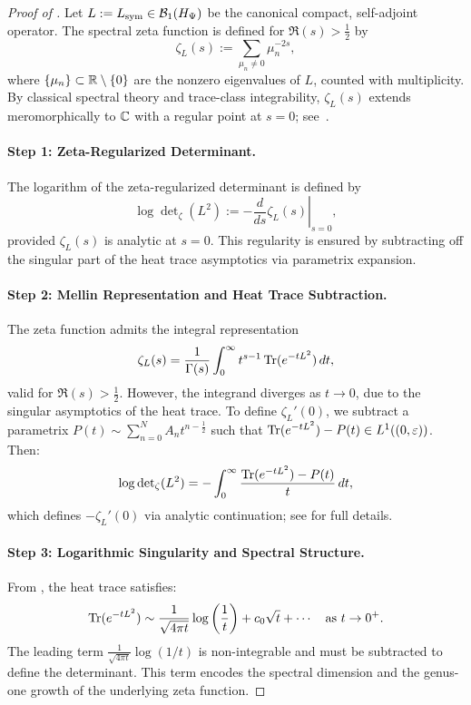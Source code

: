 \begin{proof}[Proof of ]
Let \( L := L_{\mathrm{sym}} \in \mathcal{B}_1(H_{\Psi}) \) be the canonical compact, self-adjoint operator. The spectral zeta function is defined for \( \Re(s) > \tfrac{1}{2} \) by
\[
\zeta_L(s) := \sum_{\mu_n \neq 0} \mu_n^{-2s},
\]
where \( \{ \mu_n \} \subset \mathbb{R} \setminus \{0\} \) are the nonzero eigenvalues of \( L \), counted with multiplicity. By classical spectral theory and trace-class integrability, \( \zeta_L(s) \) extends meromorphically to \( \mathbb{C} \) with a regular point at \( s = 0 \); see~\cite[Ch.~3]{Simon2005TraceIdeals}.

\paragraph{Step 1: Zeta-Regularized Determinant.}
The logarithm of the zeta-regularized determinant is defined by
\[
\log \det\nolimits_\zeta(L^2) := -\left. \frac{d}{ds} \zeta_L(s) \right|_{s=0},
\]
provided \( \zeta_L(s) \) is analytic at \( s = 0 \). This regularity is ensured by subtracting off the singular part of the heat trace asymptotics via parametrix expansion.

\paragraph{Step 2: Mellin Representation and Heat Trace Subtraction.}
The zeta function admits the integral representation
\[
\zeta_L(s) = \frac{1}{\Gamma(s)} \int_0^\infty t^{s - 1} \operatorname{Tr}(e^{-t L^2}) \, dt,
\]
valid for \( \Re(s) > \tfrac{1}{2} \). However, the integrand diverges as \( t \to 0 \), due to the singular asymptotics of the heat trace. To define \( \zeta_L'(0) \), we subtract a parametrix \( P(t) \sim \sum_{n=0}^{N} A_n t^{n - \frac{1}{2}} \) such that \( \operatorname{Tr}(e^{-t L^2}) - P(t) \in L^1((0,\varepsilon)) \). Then:
\[
\log \det\nolimits_\zeta(L^2)
= -\int_0^\infty \frac{\operatorname{Tr}(e^{-t L^2}) - P(t)}{t} \, dt,
\]
which defines \( -\zeta_L'(0) \) via analytic continuation; see  for full details.

\paragraph{Step 3: Logarithmic Singularity and Spectral Structure.}
From , the heat trace satisfies:
\[
\operatorname{Tr}(e^{-t L^2}) \sim \frac{1}{\sqrt{4\pi t}} \log\left( \frac{1}{t} \right) + c_0 \sqrt{t} + \cdots \quad \text{as } t \to 0^+.
\]
The leading term \( \frac{1}{\sqrt{4\pi t}} \log(1/t) \) is non-integrable and must be subtracted to define the determinant. This term encodes the spectral dimension and the genus-one growth of the underlying zeta function.


\end{proof}
